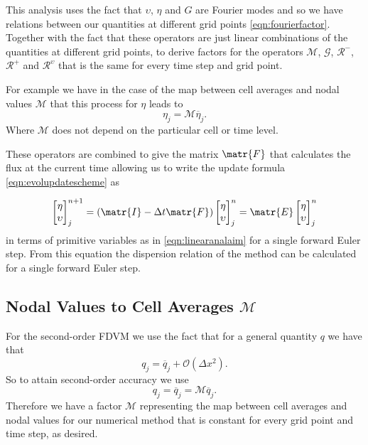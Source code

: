 This analysis uses the fact that $\upsilon$, $\eta$ and $G$ are Fourier modes and so we have relations between our quantities at different grid points \eqref{eqn:fourierfactor}. Together with the fact that these operators are just linear combinations of the quantities at different grid points, to derive factors for the operators $\mathcal{M}$, $\mathcal{G}$, $\mathcal{R}^{-}$, $\mathcal{R}^{+}$ and $\mathcal{R}^{\upsilon}$ that is the same for every time step and grid point.

For example we have in the case of the map between cell averages and nodal values $\mathcal{M}$ that this process for $\eta$ leads to
\[\eta_j = \mathcal{M} \overline{\eta}_j.\]
Where $\mathcal{M}$ does not depend on the particular cell or time level.

These operators are combined to give the matrix $\matr{F}$ that calculates the flux at the current time allowing us to write the update formula \eqref{eqn:evolupdatescheme} as

\begin{equation*}
\begin{bmatrix}
\eta \\ \upsilon
\end{bmatrix}^{n+1}_j = \left(\matr{I}  - \Delta t \matr{F} \right) \begin{bmatrix}
\eta \\ \upsilon
\end{bmatrix}^{n}_j = \matr{E} \begin{bmatrix}
\eta \\ \upsilon
\end{bmatrix}^{n}_j
\end{equation*}
in terms of primitive variables as in \eqref{eqn:linearanalaim} for a single forward Euler step. From this equation the dispersion relation of the method can be calculated for a single forward Euler step. 

\subsection{Nodal Values to Cell Averages $\mathcal{M}$}
For the second-order FDVM we use the fact that for a general quantity $q$ we have that
\begin{equation*}
q_j = \overline{q}_j + \mathcal{O}\left(\Delta x^2\right).
\end{equation*}
%
So to attain second-order accuracy we use
%
\begin{equation}
\label{eqn:Mfactorfourier}
q_j = \overline{q}_j  = \mathcal{M} \overline{q}_j.
\end{equation}
Therefore we have a factor $\mathcal{M}$ representing the map between cell averages and nodal values for our numerical method that is constant for every grid point and time step, as desired.


